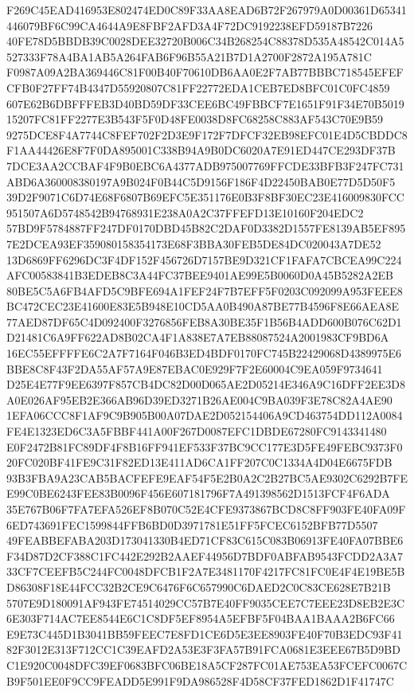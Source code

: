 \documentclass[UTF8,fontset=fandol,zihao=-4,a4paper]{ctexart}
\begin{document}
{{F269C45EAD416953E802474ED0C89F33AA8EAD6B72F267979A0D00361D65341446079BF6C99CA4644A9E8FBF2AFD3A4F72DC9192238EFD59187B7226
40FE78D5BBDB39C0028DEE32720B006C34B268254C88378D535A48542C014A5527333F78A4BA1AB5A264FAB6F96B55A21B7D1A2700F2872A195A781C
F0987A09A2BA369446C81F00B40F70610DB6AA0E2F7AB77BBBC718545EFEFCFB0F27FF74B4347D55920807C81FF22772EDA1CEB7ED8BFC01C0FC4859
607E62B6DBFFFEB3D40BD59DF33CEE6BC49FBBCF7E1651F91F34E70B501915207FC81FF2277E3B543F5F0D48FE0038D8FC68258C883AF543C70E9B59
9275DCE8F4A7744C8FEF702F2D3E9F172F7DFCF32EB98EFC01E4D5CBDDC8F1AA44426E8F7F0DA895001C338B94A9B0DC6020A7E91ED447CE293DF37B
7DCE3AA2CCBAF4F9B0EBC6A4377ADB975007769FFCDE33BFB3F247FC731ABD6A360008380197A9B024F0B44C5D9156F186F4D22450BAB0E77D5D50F5
39D2F9071C6D74E68F6807B69EFC5E351176E0B3F8BF30EC23E416009830FCC951507A6D5748542B94768931E238A0A2C37FFEFD13E10160F204EDC2
57BD9F5784887FF247DF0170DBD45B82C2DAF0D3382D1557FE8139AB5EF8957E2DCEA93EF359080158354173E68F3BBA30FEB5DE84DC020043A7DE52
13D6869FF6296DC3F4DF152F456726D7157BE9D321CF1FAFA7CBCEA99C224AFC00583841B3EDEB8C3A44FC37BEE9401AE99E5B0060D0A45B5282A2EB
80BE5C5A6FB4AFD5C9BFE694A1FEF24F7B7EFF5F0203C092099A953FEEE8BC472CEC23E41600E83E5B948E10CD5AA0B490A87BE77B4596F8E66AEA8E
77AED87DF65C4D092400F3276856FEB8A30BE35F1B56B4ADD600B076C62D1D21481C6A9FF622AD8B02CA4F1A838E7A7EB88087524A2001983CF9BD6A
16EC55EFFFFE6C2A7F7164F046B3ED4BDF0170FC745B22429068D4389975E6BBE8C8F43F2DA55AF57A9E87EBAC0E929F7F2E60004C9EA059F9734641
D25E4E77F9EE6397F857CB4DC82D00D065AE2D05214E346A9C16DFF2EE3D8A0E026AF95EB2E366AB96D39ED3271B26AE004C9BA039F3E78C82A4AE90
1EFA06CCC8F1AF9C9B905B00A07DAE2D052154406A9CD463754DD112A0084FE4E1323ED6C3A5FBBF441A00F267D0087EFC1DBDE67280FC9143341480
E0F2472B81FC89DF4F8B16FF941EF533F37BC9CC177E3D5FE49FEBC9373F020FC020BF41FE9C31F82ED13E411AD6CA1FF207C0C1334A4D04E6675FDB
93B3FBA9A23CAB5BACFEFE9EAF54F5E2B0A2C2B27BC5AE9302C6292B7FEE99C0BE6243FEE83B0096F456E607181796F7A491398562D1513FCF4F6ADA
35E767B06F7FA7EFA526EF8B070C52E4CFE9373867BCD8C8FF903FE40FA09F6ED743691FEC1599844FFB6BD0D3971781E51FF5FCEC6152BFB77D5507
49FEABBEFABA203D173041330B4ED71CF83C615C083B06913FE40FA07BBE6F34D87D2CF388C1FC442E292B2AAEF44956D7BDF0ABFAB9543FCDD2A3A7
33CF7CEEFB5C244FC0048DFCB1F2A7E3481170F4217FC81FC0E4F4E19BE5BD86308F18E44FCC32B2CE9C6476F6C657990C6DAED2C0C83CE628E7B21B
5707E9D180091AF943FE74514029CC57B7E40FF9035CEE7C7EEE23D8EB2E3C6E303F714AC7EE8544E6C1C8DF5EF8954A5EFBF5F04BAA1BAAA2B6FC66
E9E73C445D1B3041BB59FEEC7E8FD1CE6D5E3EE8903FE40F70B3EDC93F4182F3012E313F712CC1C39EAFD2A53E3F3FA57B91FCA0681E3EEE67B5D9BD
C1E920C0048DFC39EF0683BFC06BE18A5CF287FC01AE753EA53FCEFC0067CB9F501EE0F9CC9FEADD5E991F9DA986528F4D58CF37FED1862D1F41747C
}}
\end{document}
